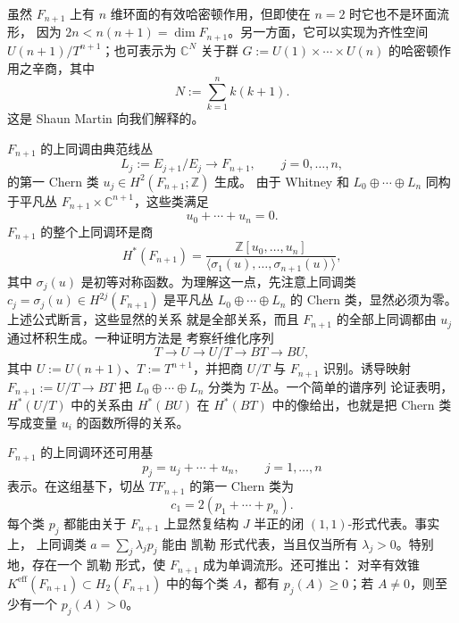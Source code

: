 \begin{remark}\label{rem:11-3-13}
虽然 $F_{n+1}$ 上有 $n$ 维环面的有效哈密顿作用，但即使在 $n=2$ 时它也不是环面流形，
因为 $2n<n(n+1)=\dim F_{n+1}$。另一方面，它可以实现为齐性空间
$U(n+1)/T^{n+1}$；也可表示为 $\mathbb C^N$ 关于群
$G:=U(1)\times\cdots\times U(n)$ 的哈密顿作用之辛商，其中
\[
  N:=\sum_{k=1}^n k(k+1).
\]
这是 Shaun Martin 向我们解释的。
\end{remark}

$F_{n+1}$ 的上同调由典范线丛
\[
  L_j:=E_{j+1}/E_j\longrightarrow F_{n+1},
  \qquad j=0,\ldots,n,
\]
的第一 Chern 类 $u_j\in H^2(F_{n+1};\mathbb Z)$ 生成。
由于 Whitney 和 $L_0\oplus\cdots\oplus L_n$ 同构于平凡丛
$F_{n+1}\times\mathbb C^{n+1}$，这些类满足
\[
  u_0+\cdots+u_n=0.
\]
$F_{n+1}$ 的整个上同调环是商
\[
  H^*(F_{n+1})=
  \frac{\mathbb Z[u_0,\ldots,u_n]}
  {\langle\sigma_1(u),\ldots,\sigma_{n+1}(u)\rangle},
\]
其中 $\sigma_j(u)$ 是初等对称函数。为理解这一点，先注意上同调类
$c_j=\sigma_j(u)\in H^{2j}(F_{n+1})$ 是平凡丛
$L_0\oplus\cdots\oplus L_n$ 的 Chern 类，显然必须为零。上述公式断言，这些显然的关系
就是全部关系，而且 $F_{n+1}$ 的全部上同调都由 $u_j$ 通过杯积生成。一种证明方法是
考察纤维化序列
\[
  T\longrightarrow U\longrightarrow U/T\longrightarrow BT\longrightarrow BU,
\]
其中 $U:=U(n+1)$、$T:=T^{n+1}$，并把商 $U/T$ 与 $F_{n+1}$ 识别。诱导映射
$F_{n+1}:=U/T\to BT$ 把 $L_0\oplus\cdots\oplus L_n$ 分类为 $T$-丛。一个简单的谱序列
论证表明，$H^*(U/T)$ 中的关系由 $H^*(BU)$ 在 $H^*(BT)$ 中的像给出，也就是把 Chern
类写成变量 $u_i$ 的函数所得的关系。

$F_{n+1}$ 的上同调环还可用基
\[
  p_j=u_j+\cdots+u_n,
  \qquad j=1,\ldots,n
\]
表示。在这组基下，切丛 $TF_{n+1}$ 的第一 Chern 类为
\[
  c_1=2(p_1+\cdots+p_n).
\]
每个类 $p_j$ 都能由关于 $F_{n+1}$ 上显然复结构 $J$ 半正的闭 $(1,1)$-形式代表。事实上，
上同调类 $a=\sum_j\lambda_jp_j$ 能由 凯勒 形式代表，当且仅当所有
$\lambda_j>0$。特别地，存在一个 凯勒 形式，使 $F_{n+1}$ 成为单调流形。还可推出：
对辛有效锥 $K^{\mathrm{eff}}(F_{n+1})\subset H_2(F_{n+1})$ 中的每个类 $A$，都有
$p_j(A)\geq0$；若 $A\ne0$，则至少有一个 $p_j(A)>0$。

